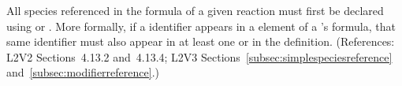 All species referenced in the \StoichiometryMath formula of a given
reaction must first be declared using \SpeciesReference or
\ModifierSpeciesReference.  More formally, if a \Species identifier appears
in a  element of a \Reaction's \StoichiometryMath formula, that
same identifier must also appear in at least one \SpeciesReference or
\ModifierSpeciesReference in the \Reaction definition.  (References: L2V2
Sections~4.13.2 and~4.13.4; L2V3 Sections~\ref{subsec:simplespeciesreference}
and~\ref{subsec:modifierreference}.)
